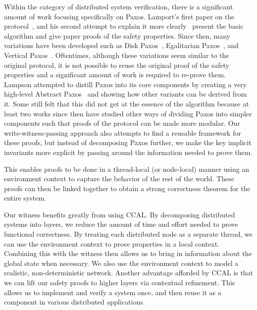 Within the category of distributed system verification, there is a significant amount of work focusing specifically on Paxos.
Lamport's first paper on the protocol~\cite{paxos}, and his second attempt to explain it more clearly~\cite{paxosmadesimple}
present the basic algorithm and give paper proofs of the safety properties.
Since then, many variations have been developed such as Disk Paxos~\cite{diskpaxos}, Egalitarian Paxos~\cite{epaxos},
and Vertical Paxos~\cite{vertpaxos}.
Oftentimes, although these variations seem similar to the original protocol, it is not possible to reuse the original
proof of the safety properties and a significant amount of work is required to re-prove them.
Lampson attempted to distill Paxos into its core components by creating a very high-level Abstract Paxos~\cite{Lampson2001}
and showing how other variants can be derived from it.
Some still felt that this did not get at the essence of the algorithm because at least two works since then \cite{dpaxos, sdpaxos}
have studied other ways of dividing Paxos into simpler components such that proofs of the protocol can be made more modular.
Our write-witness-passing approach also attempts to find a reusable framework for these proofs,
but instead of decomposing Paxos further, we make the key implicit invariants more explicit by passing around
the information needed to prove them.

This enables proofs to be done in a thread-local (or node-local) manner using an environment context to
capture the behavior of the rest of the world.
These proofs can then be linked together to obtain a strong correctness theorem for the entire system.

Our witness benefits greatly from using CCAL.
By decomposing distributed systems into layers, we reduce the amount of time and effort needed to
prove functional correctness.
By treating each distributed node as a separate thread, we can use the environment context to
prove properties in a local context.
Combining this with the witness then allows us to bring in information about the global state when necessary.
We also use the environment context to model a realistic, non-deterministic network.
Another advantage afforded by CCAL is that we can lift our safety proofs to higher layers via contextual refinement.
This allows us to implement and verify a system once, and then reuse it as a component in various distributed applications.


